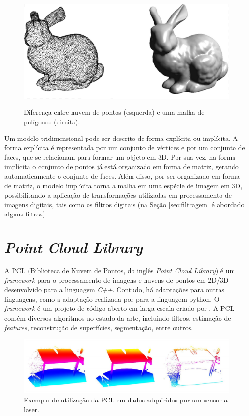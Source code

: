 \begin{figure}[H]
    \centering
    \caption{Diferença entre nuvem de pontos (esquerda) e uma malha de polígonos (direita).}
    \includegraphics[scale=0.3]{dados/figuras/bunny_example.png}
    \label{fig:bunny_example}
\end{figure}

Um modelo tridimensional pode ser descrito de forma explícita ou implícita.
A forma explícita é representada por um conjunto de vértices e por um conjunto de faces, que se relacionam para formar um objeto em 3D.
Por sua vez, na forma implícita o conjunto de pontos já está organizado em forma de matriz, gerando automaticamente o conjunto de faces. 
Além disso, por ser organizado em forma de matriz, o modelo implícita torna a malha em uma espécie de imagem em 3D, possibilitando a aplicação de transformações utilizadas em processamento de imagens digitais, tais como os filtros digitais (na Seção \ref{sec:filtragem} é abordado alguns filtros). 
\fi

\section{\textit{Point Cloud Library}}
\label{sec:pcl}

A PCL (Biblioteca de Nuvem de Pontos, do inglês \textit{Point Cloud Library}) é um \textit{framework} para o processamento de imagens e nuvens de pontos em 2D/3D desenvolvido para a linguagem \textit{C++}. Contudo, há adaptações para outras linguagens, como a adaptação realizada por \cite{strawlab2012} para a linguagem python. 
O \textit{framework} é um projeto de código aberto em larga escala criado por \cite{rusu2011pcl}. 
A PCL contém diversos algoritmos no estado da arte, incluindo filtros, estimação de \textit{features}, reconstrução de superfícies, segmentação, entre outros. 

\begin{figure}[H]
    \centering
    \caption{Exemplo de utilização da PCL em dados adquiridos por um sensor a laser.}
    \label{fig:pcl_example}
    \includegraphics[scale=0.3]{dados/figuras/pcl_example.png}
\end{figure}

